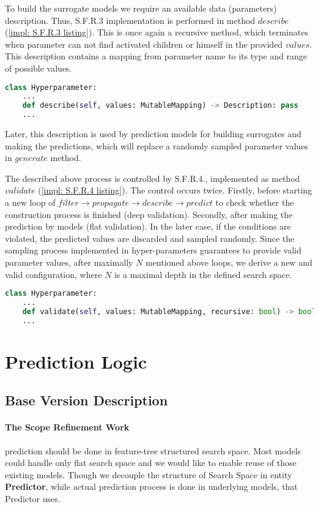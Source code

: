 To build the surrogate models we require an available data (parameters) description. Thus, S.F.R.3 implementation is performed in method $describe$ (\cref{impl: S.F.R.3 listing}). This is once again a recursive method, which terminates when parameter can not find activated children or himself in the provided $values$. 
This description contains a mapping from parameter name to its type and range of possible values.

\begin{lstlisting}[language=Python, caption=S.F.R.3 implementation., label=impl: S.F.R.3 listing]
class Hyperparameter:
	...
    def describe(self, values: MutableMapping) -> Description: pass
	...
\end{lstlisting}

Later, this description is used by prediction models for building surrogates and making the predictions, which will replace a randomly sampled parameter values in $generate$ method.

The described above process is controlled by S.F.R.4., implemented as method $validate$ (\cref{impl: S.F.R.4 listing}). The control occurs twice. Firstly, before starting a new loop of $filter \rightarrow propagate \rightarrow describe \rightarrow predict$ to check whether the construction process is finished (deep validation). Secondly, after making the prediction by models (flat validation). In the later case, if the conditions are violated, the predicted values are discarded and sampled randomly. Since the sampling process implemented in hyper-parameters guarantees to provide valid parameter values, after maximally $N$ mentioned above loops, we derive a new and valid configuration, where $N$ is a maximal depth in the defined search space.

\begin{lstlisting}[language=Python, caption=S.F.R.4 implementation., label=impl: S.F.R.4 listing]
class Hyperparameter:
	...
	def validate(self, values: MutableMapping, recursive: bool) -> bool: pass
	...
\end{lstlisting}


\section{Prediction Logic}\label{impl: prediction logic}
\subsection{Base Version Description}
\paragraph{The Scope Refinement Work} prediction should be done in feature-tree structured search space. Most models could handle only flat search space and we would like to enable reuse of those existing models. Though we decouple the structure of Search Space in entity \textbf{Predictor}, while actual prediction process is done in underlying models, that Predictor uses.

